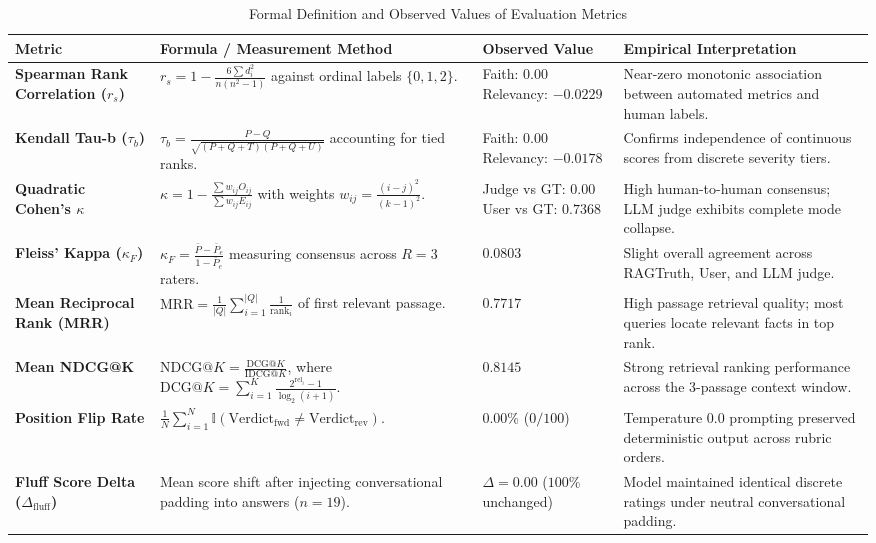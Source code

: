 \documentclass[11pt,a4paper]{article}
\renewcommand{\arraystretch}{1.2}
\begin{document}
\begin{table}[htbp]
\centering
\caption{Formal Definition and Observed Values of Evaluation Metrics}
\label{tab:eval_metrics}
\footnotesize
\renewcommand{\arraystretch}{1.3}
\begin{tabularx}{\linewidth}{|>{\RaggedRight\bfseries}p{2.8cm}|>{\RaggedRight}X|>{\centering\arraybackslash}p{2.4cm}|>{\RaggedRight}p{4.2cm}|}
\hline
\rowcolor{tableheader}
Metric & Formula / Measurement Method & Observed Value & Empirical Interpretation \\
\hline
\textbf{Spearman Rank Correlation ($r_s$)} & $r_s = 1 - \frac{6 \sum d_i^2}{n(n^2 - 1)}$ against ordinal labels $\{0, 1, 2\}$. & Faith: $0.00$ \newline Relevancy: $-0.0229$ & Near-zero monotonic association between automated metrics and human labels. \\
\hline
\textbf{Kendall Tau-b ($\tau_b$)} & $\tau_b = \frac{P - Q}{\sqrt{(P + Q + T)(P + Q + U)}}$ accounting for tied ranks. & Faith: $0.00$ \newline Relevancy: $-0.0178$ & Confirms independence of continuous scores from discrete severity tiers. \\
\hline
\textbf{Quadratic Cohen's $\kappa$} \cite{cohen1968weighted} & $\kappa = 1 - \frac{\sum w_{ij} O_{ij}}{\sum w_{ij} E_{ij}}$ with weights $w_{ij} = \frac{(i - j)^2}{(k - 1)^2}$. & Judge vs GT: $0.00$ \newline User vs GT: $0.7368$ & High human-to-human consensus; LLM judge exhibits complete mode collapse. \\
\hline
\textbf{Fleiss' Kappa ($\kappa_F$)} \cite{fleiss1971measuring} & $\kappa_F = \frac{\bar{P} - \bar{P}_e}{1 - \bar{P}_e}$ measuring consensus across $R=3$ raters. & $0.0803$ & Slight overall agreement across RAGTruth, User, and LLM judge. \\
\hline
\textbf{Mean Reciprocal Rank (MRR)} & $\text{MRR} = \frac{1}{|Q|} \sum_{i=1}^{|Q|} \frac{1}{\text{rank}_i}$ of first relevant passage. & $0.7717$ & High passage retrieval quality; most queries locate relevant facts in top rank. \\
\hline
\textbf{Mean NDCG@K} & $\text{NDCG}@K = \frac{\text{DCG}@K}{\text{IDCG}@K}$, where $\text{DCG}@K = \sum_{i=1}^K \frac{2^{\text{rel}_i} - 1}{\log_2(i + 1)}$. & $0.8145$ & Strong retrieval ranking performance across the 3-passage context window. \\
\hline
\textbf{Position Flip Rate} & $\frac{1}{N} \sum_{i=1}^N \mathbb{I}(\text{Verdict}_{\text{fwd}} \ne \text{Verdict}_{\text{rev}})$. & $0.00\%$ ($0/100$) & Temperature 0.0 prompting preserved deterministic output across rubric orders. \\
\hline
\textbf{Fluff Score Delta ($\Delta_{\text{fluff}}$)} & Mean score shift after injecting conversational padding into answers ($n=19$). & $\Delta = 0.00$ ($100\%$ unchanged) & Model maintained identical discrete ratings under neutral conversational padding. \\
\hline
\end{tabularx}
\end{table}
\end{document}
